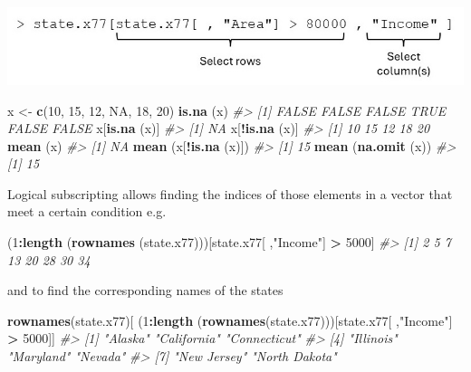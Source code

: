\documentclass[
]{book}
\newenvironment{Shaded}{\begin{snugshade}}{\end{snugshade}}
\newcommand{\CommentTok}[1]{\textcolor[rgb]{0.56,0.35,0.01}{\textit{#1}}}
\newcommand{\ConstantTok}[1]{\textcolor[rgb]{0.56,0.35,0.01}{#1}}
\newcommand{\DecValTok}[1]{\textcolor[rgb]{0.00,0.00,0.81}{#1}}
\newcommand{\FunctionTok}[1]{\textcolor[rgb]{0.13,0.29,0.53}{\textbf{#1}}}
\newcommand{\NormalTok}[1]{#1}
\newcommand{\OtherTok}[1]{\textcolor[rgb]{0.56,0.35,0.01}{#1}}
\newcommand{\SpecialCharTok}[1]{\textcolor[rgb]{0.81,0.36,0.00}{\textbf{#1}}}
\newcommand{\StringTok}[1]{\textcolor[rgb]{0.31,0.60,0.02}{#1}}
\begin{document}
\includegraphics[width=0.8\linewidth]{pics/matrixSubscripting}

\begin{Shaded}
\begin{Highlighting}[]
\NormalTok{x }\OtherTok{\textless{}{-}} \FunctionTok{c}\NormalTok{(}\DecValTok{10}\NormalTok{, }\DecValTok{15}\NormalTok{, }\DecValTok{12}\NormalTok{, }\ConstantTok{NA}\NormalTok{, }\DecValTok{18}\NormalTok{, }\DecValTok{20}\NormalTok{)}
\FunctionTok{is.na}\NormalTok{ (x)}
\CommentTok{\#\textgreater{} [1] FALSE FALSE FALSE  TRUE FALSE FALSE}
\NormalTok{x[}\FunctionTok{is.na}\NormalTok{ (x)]}
\CommentTok{\#\textgreater{} [1] NA}
\NormalTok{x[}\SpecialCharTok{!}\FunctionTok{is.na}\NormalTok{ (x)]}
\CommentTok{\#\textgreater{} [1] 10 15 12 18 20}
\FunctionTok{mean}\NormalTok{ (x)}
\CommentTok{\#\textgreater{} [1] NA}
\FunctionTok{mean}\NormalTok{ (x[}\SpecialCharTok{!}\FunctionTok{is.na}\NormalTok{ (x)])}
\CommentTok{\#\textgreater{} [1] 15}
\FunctionTok{mean}\NormalTok{ (}\FunctionTok{na.omit}\NormalTok{ (x))}
\CommentTok{\#\textgreater{} [1] 15}
\end{Highlighting}
\end{Shaded}

Logical subscripting allows finding the indices of those elements in a vector that meet a certain condition e.g.

\begin{Shaded}
\begin{Highlighting}[]
\NormalTok{(}\DecValTok{1}\SpecialCharTok{:}\FunctionTok{length}\NormalTok{ (}\FunctionTok{rownames}\NormalTok{ (state.x77)))[state.x77[ ,}\StringTok{"Income"}\NormalTok{] }\SpecialCharTok{\textgreater{}} \DecValTok{5000}\NormalTok{]}
\CommentTok{\#\textgreater{} [1]  2  5  7 13 20 28 30 34}
\end{Highlighting}
\end{Shaded}

and to find the corresponding names of the states

\begin{Shaded}
\begin{Highlighting}[]
\FunctionTok{rownames}\NormalTok{(state.x77)[}
\NormalTok{  (}\DecValTok{1}\SpecialCharTok{:}\FunctionTok{length}\NormalTok{ (}\FunctionTok{rownames}\NormalTok{(state.x77)))[state.x77[ ,}\StringTok{"Income"}\NormalTok{] }\SpecialCharTok{\textgreater{}} \DecValTok{5000}\NormalTok{]]}
\CommentTok{\#\textgreater{} [1] "Alaska"       "California"   "Connecticut" }
\CommentTok{\#\textgreater{} [4] "Illinois"     "Maryland"     "Nevada"      }
\CommentTok{\#\textgreater{} [7] "New Jersey"   "North Dakota"}
\end{Highlighting}
\end{Shaded}
\end{document}
